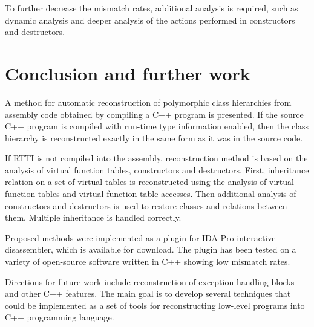\documentclass[10pt, conference]{IEEEtran}
\begin{document}
To further decrease the
mismatch rates, additional analysis is required, such as dynamic analysis
and deeper analysis of the actions performed in constructors and destructors.




\section{Conclusion and further work}
A method for automatic reconstruction of polymorphic class hierarchies
from assembly code obtained by compiling a C++ program is presented.
If the source C++ program is compiled with run-time type information enabled,
then the class hierarchy is reconstructed exactly in the same form as it
was in the source code.

If RTTI is not compiled into the assembly, reconstruction
method is based on the analysis of virtual function tables, constructors and destructors.
First, inheritance relation on a set of virtual tables is reconstructed using
the analysis of virtual function tables and virtual function table accesses.
Then additional analysis of constructors and destructors is used to restore
classes and relations between them. Multiple inheritance is handled
correctly.

Proposed methods were implemented as a plugin for IDA Pro interactive disassembler,
which is available for download.
The plugin has been tested on a variety of open-source software written in C++
showing low mismatch rates.

Directions for future work include
reconstruction of exception handling blocks and other C++ features.
The main goal is to develop several techniques that could be implemented
as a set of tools for reconstructing low-level programs into C++
programming language.






\end{document}
